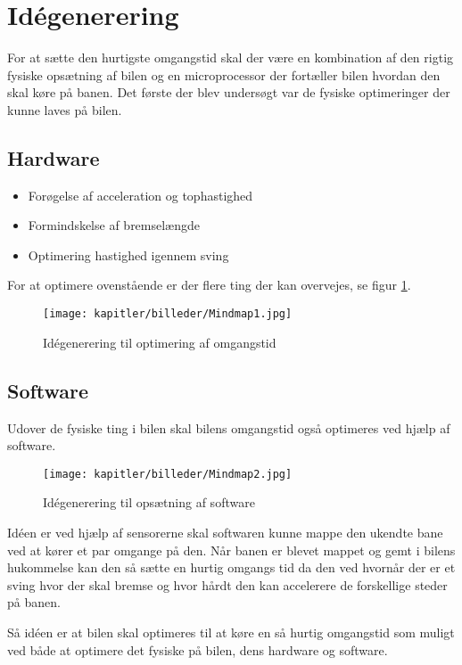 
\newpage
\section{Idégenerering}
For at sætte den hurtigste omgangstid skal der være en kombination af den rigtig fysiske opsætning af bilen og en microprocessor der fortæller bilen hvordan den skal køre på banen. Det første der blev undersøgt var de fysiske optimeringer der kunne laves på bilen.
\subsection{Hardware}
\begin{itemize}
\item Forøgelse af acceleration og tophastighed
\item Formindskelse af bremselængde
\item Optimering hastighed igennem sving
\end{itemize}
For at optimere ovenstående er der flere ting der kan overvejes, se figur \ref{fig:mindmap1}.

\begin{figure}[ht]
    \centering
    \texttt{[image: kapitler/billeder/Mindmap1.jpg]}
    \caption{Idégenerering til optimering af omgangstid}
    \label{fig:mindmap1}
\end{figure}

\subsection{Software}

Udover de fysiske ting i bilen skal bilens omgangstid også optimeres ved hjælp af software.


\newpage

\begin{figure}[ht]
    \centering
    \texttt{[image: kapitler/billeder/Mindmap2.jpg]}
    \caption{Idégenerering til opsætning af software}
    \label{fig:mindmap2}
\end{figure}


Idéen er ved hjælp af sensorerne skal softwaren kunne mappe den ukendte bane ved at kører et par omgange på den. Når banen er blevet mappet og gemt i bilens hukommelse kan den så sætte en hurtig omgangs tid da den ved hvornår der er et sving hvor der skal bremse og hvor hårdt den kan accelerere de forskellige steder på banen.

Så idéen er at bilen skal optimeres til at køre en så hurtig omgangstid som muligt ved både at optimere det fysiske på bilen, dens hardware og software.
